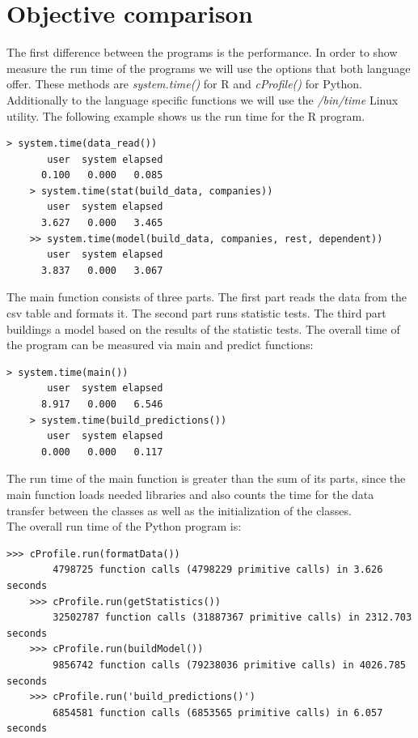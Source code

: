 \documentclass[
  twoside,
  11pt, a4paper,
  footinclude=true,
  headinclude=true,
  cleardoublepage=empty
]{scrreprt}
\begin{document}
    \section{Objective comparison}
    The first difference between the programs is the performance. In order to show measure the run time of the programs we will use the options that both language offer. These methods are \textit{system.time()} for R and \textit{cProfile()} for Python. Additionally to the language specific functions we will use the \textit{/bin/time} Linux utility. The following example shows us the run time for the R program.
    \begin{lstlisting}[basicstyle=\footnotesize]
    > system.time(data_read())                                                  
       user  system elapsed                                                         
      0.100   0.000   0.085  
    > system.time(stat(build_data, companies))
       user  system elapsed 
      3.627   0.000   3.465
    >> system.time(model(build_data, companies, rest, dependent))
       user  system elapsed 
      3.837   0.000   3.067 
    \end{lstlisting}
    The main function consists of three parts. The first part reads the data from the csv table and formats it. The second part runs statistic tests. The third part buildings a model based on the results of the statistic tests. The overall time of the program can be measured via main and predict functions:
    \begin{lstlisting}[basicstyle=\footnotesize]
    > system.time(main())
       user  system elapsed 
      8.917   0.000   6.546 
    > system.time(build_predictions())
       user  system elapsed 
      0.000   0.000   0.117 
    \end{lstlisting}
    The run time of the main function is greater than the sum of its parts, since the main function loads needed libraries and also counts the time for the data transfer between the classes as well as the initialization of the classes.\\
    The overall run time of the Python program is:
    \begin{lstlisting}[basicstyle=\footnotesize]
    >>> cProfile.run(formatData())
        4798725 function calls (4798229 primitive calls) in 3.626 seconds
    >>> cProfile.run(getStatistics())
        32502787 function calls (31887367 primitive calls) in 2312.703 seconds
    >>> cProfile.run(buildModel())
        9856742 function calls (79238036 primitive calls) in 4026.785 seconds
    >>> cProfile.run('build_predictions()')
        6854581 function calls (6853565 primitive calls) in 6.057 seconds
    \end{lstlisting}
\end{document}
